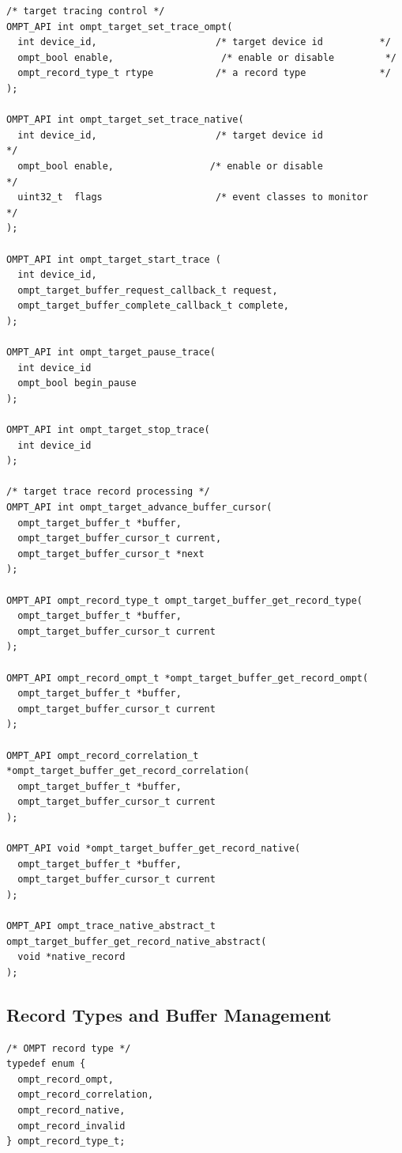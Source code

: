 \documentclass{article}
\begin{document}
{\begin{verbatim}
/* target tracing control */
OMPT_API int ompt_target_set_trace_ompt(
  int device_id,                     /* target device id          */
  ompt_bool enable,                   /* enable or disable         */
  ompt_record_type_t rtype           /* a record type             */
);

OMPT_API int ompt_target_set_trace_native(
  int device_id,                     /* target device id                */
  ompt_bool enable,                 /* enable or disable               */
  uint32_t  flags                    /* event classes to monitor        */
);

OMPT_API int ompt_target_start_trace (
  int device_id,
  ompt_target_buffer_request_callback_t request,
  ompt_target_buffer_complete_callback_t complete,
);

OMPT_API int ompt_target_pause_trace(
  int device_id
  ompt_bool begin_pause
);

OMPT_API int ompt_target_stop_trace(
  int device_id
);

/* target trace record processing */
OMPT_API int ompt_target_advance_buffer_cursor(
  ompt_target_buffer_t *buffer,
  ompt_target_buffer_cursor_t current,
  ompt_target_buffer_cursor_t *next
);

OMPT_API ompt_record_type_t ompt_target_buffer_get_record_type(
  ompt_target_buffer_t *buffer,
  ompt_target_buffer_cursor_t current
);

OMPT_API ompt_record_ompt_t *ompt_target_buffer_get_record_ompt(
  ompt_target_buffer_t *buffer,
  ompt_target_buffer_cursor_t current
);

OMPT_API ompt_record_correlation_t *ompt_target_buffer_get_record_correlation(
  ompt_target_buffer_t *buffer,
  ompt_target_buffer_cursor_t current
);
   
OMPT_API void *ompt_target_buffer_get_record_native(
  ompt_target_buffer_t *buffer,
  ompt_target_buffer_cursor_t current
);
  
OMPT_API ompt_trace_native_abstract_t ompt_target_buffer_get_record_native_abstract(
  void *native_record
);
\end{verbatim}

\clearpage  
\subsection{Record Types and Buffer Management}
\label{appendix:ompt-records}

\begin{verbatim}
/* OMPT record type */
typedef enum {
  ompt_record_ompt,
  ompt_record_correlation,
  ompt_record_native,
  ompt_record_invalid
} ompt_record_type_t; 


\end{verbatim}}
\end{document}
